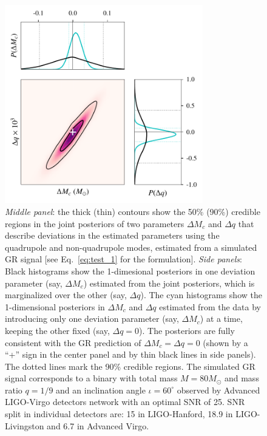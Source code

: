 \documentclass[prd,preprintnumbers,twocolumn,eqsecnum,floatfix,a4paper,nofootinbib,superscriptaddress]{revtex4}
\begin{document}
\begin{figure}[htb] \begin{center}
		\includegraphics[width=3.4in]{figs/hm_mcq_GR.pdf}
		\caption{\emph{Middle panel}: the thick (thin) contours show the 50\% (90\%) credible regions in the joint posteriors of two parameters $\Delta M_c$ and $\Delta q$ that describe deviations in the estimated parameters using the quadrupole and non-quadrupole modes, estimated from a simulated GR signal [see Eq.~\eqref{eq:test_1} for the formulation]. \emph{Side panels}: Black histograms show the 1-dimesional posteriors in one deviation parameter (say, $\Delta M_c$) estimated from the joint posteriors, which is marginalized over the other (say, $\Delta q$). The cyan histograms show the 1-dimensional posteriors in $\Delta M_c$ and $\Delta q$ estimated from the data by introducing only one deviation parameter (say, $\Delta M_c$) at a time, keeping the other fixed (say, $\Delta q = 0$). The posteriors are fully consistent with the GR prediction of $\Delta M_c = \Delta q = 0$ (shown by a ``+'' sign in the center panel and by thin black lines in side panels). The dotted lines mark the 90\% credible regions. The simulated GR signal corresponds to a binary with total mass $M = {80}M_\odot$ and mass ratio $q = 1/9$ and an inclination angle $\iota = {60^\circ}$ observed by Advanced LIGO-Virgo detectors network with an optimal SNR of 25. SNR split in individual detectors are: 15 in LIGO-Hanford, 18.9 in LIGO-Livingston and 6.7 in Advanced Virgo.}
		\label{fig:posterior_BBH_GR_inj}
\end{center} \end{figure}
\end{document}
